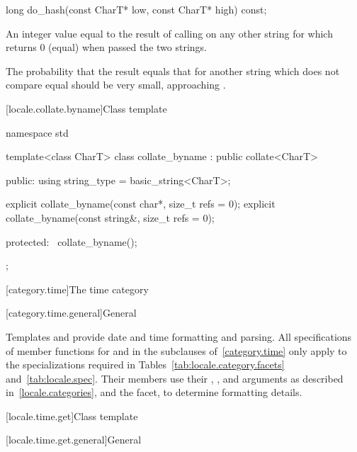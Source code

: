 %
\begin{itemdecl}
long do_hash(const CharT* low, const CharT* high) const;
\end{itemdecl}

\begin{itemdescr}
\pnum
\returns
An integer value equal to the result of calling 
on any other string for which  returns 0 (equal)
when passed the two strings.

\pnum
\recommended
The probability that the result equals that for another string
which does not compare equal should be very small,
approaching .
\end{itemdescr}

[locale.collate.byname]{Class template }

%
\begin{codeblock}
namespace std {
  template<class CharT>
    class collate_byname : public collate<CharT> {
    public:
      using string_type = basic_string<CharT>;

      explicit collate_byname(const char*, size_t refs = 0);
      explicit collate_byname(const string&, size_t refs = 0);

    protected:
      ~collate_byname();
    };
}
\end{codeblock}

[category.time]{The time category}

[category.time.general]{General}

\pnum
Templates
 and
provide date and time formatting and parsing.
All specifications of member functions for  and 
in the subclauses of~\ref{category.time} only apply to the
specializations required in Tables~\ref{tab:locale.category.facets}
and~\ref{tab:locale.spec}.
Their members use their
, , and  arguments
as described in~\ref{locale.categories},
and the  facet,
to determine formatting details.

[locale.time.get]{Class template }

[locale.time.get.general]{General}


